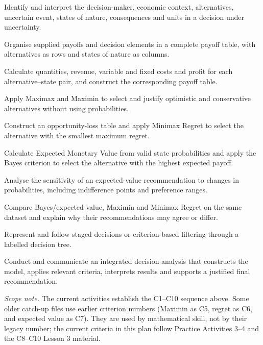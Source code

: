 \documentclass[10pt,letterpaper]{article}
\newcommand{\criterion}[2]{\item[\textbf{C#1.}] #2}
\newcommand{\plansection}[1]{\Needspace{8\baselineskip}\par\vspace{8pt}{\large\bfseries #1\par}\vspace{3pt}}
\begin{document}
\begin{description}[leftmargin=3.1em,labelwidth=2.7em,labelsep=0.4em,itemsep=2pt,topsep=2pt]
  \criterion{1}{Identify and interpret the decision-maker, economic context, alternatives, uncertain event, states of nature, consequences and units in a decision under uncertainty.}
  \criterion{2}{Organise supplied payoffs and decision elements in a complete payoff table, with alternatives as rows and states of nature as columns.}
  \criterion{3}{Calculate quantities, revenue, variable and fixed costs and profit for each alternative--state pair, and construct the corresponding payoff table.}
  \criterion{4}{Apply Maximax and Maximin to select and justify optimistic and conservative alternatives without using probabilities.}
  \criterion{5}{Construct an opportunity-loss table and apply Minimax Regret to select the alternative with the smallest maximum regret.}
  \criterion{6}{Calculate Expected Monetary Value from valid state probabilities and apply the Bayes criterion to select the alternative with the highest expected payoff.}
  \criterion{7}{Analyse the sensitivity of an expected-value recommendation to changes in probabilities, including indifference points and preference ranges.}
  \criterion{8}{Compare Bayes/expected value, Maximin and Minimax Regret on the same dataset and explain why their recommendations may agree or differ.}
  \criterion{9}{Represent and follow staged decisions or criterion-based filtering through a labelled decision tree.}
  \criterion{10}{Conduct and communicate an integrated decision analysis that constructs the model, applies relevant criteria, interprets results and supports a justified final recommendation.}
\end{description}

\textit{Scope note.} The current activities establish the C1--C10 sequence
above. Some older catch-up files use earlier criterion numbers (Maximin as C5,
regret as C6, and expected value as C7). They are used by mathematical skill,
not by their legacy number; the current criteria in this plan follow Practice
Activities 3--4 and the C8--C10 Lesson 3 material.

\plansection{3. Conceptual Standards of Disciplinary Knowledge}
\end{document}
